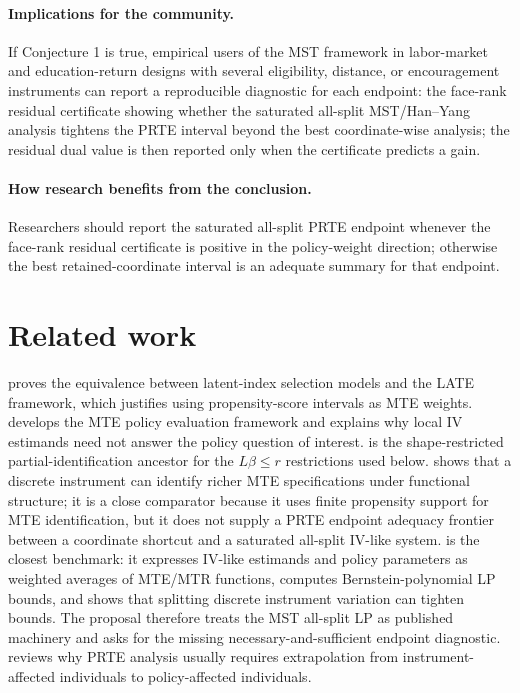 \documentclass[11pt]{article}
\theoremstyle{definition}
\theoremstyle{plain}
\theoremstyle{remark}
\begin{document}
\paragraph{Implications for the community.}
If Conjecture 1 is true, empirical users of the MST framework in
labor-market and education-return designs with several eligibility, distance,
or encouragement instruments can report a reproducible diagnostic for each
endpoint: the face-rank residual certificate showing whether the saturated all-split
MST/Han--Yang analysis tightens the PRTE interval beyond the best
coordinate-wise analysis; the residual dual value is then reported only when
the certificate predicts a gain.

\paragraph{How research benefits from the conclusion.}
Researchers should report the saturated all-split PRTE endpoint whenever the
face-rank residual certificate is positive in the policy-weight direction;
otherwise the best retained-coordinate interval is an adequate summary for
that endpoint.

\section{Related work}
\citet{Vytlacil2002} proves the equivalence between latent-index selection
models and the LATE framework, which justifies using propensity-score
intervals as MTE weights.  \citet{HeckmanVytlacil2005} develops the MTE policy
evaluation framework and explains why local IV estimands need not answer the
policy question of interest.  \citet{ManskiPepper2000} is the shape-restricted
partial-identification ancestor for the \(L\beta\le r\) restrictions used
below.  \citet{BrinchMogstadWiswall2017} shows that a discrete instrument can
identify richer MTE specifications under functional structure; it is a close
comparator because it uses finite propensity support for MTE identification,
but it does not supply a PRTE endpoint adequacy frontier between a coordinate
shortcut and a saturated all-split IV-like system.  \citet{MogstadSantosTorgovitsky2018}
is the closest benchmark: it expresses IV-like estimands and policy
parameters as weighted averages of MTE/MTR functions, computes
Bernstein-polynomial LP bounds, and shows that splitting discrete instrument
variation can tighten bounds.  The proposal therefore treats the MST all-split
LP as published machinery and asks for the missing necessary-and-sufficient
endpoint diagnostic.
\citet{MogstadTorgovitsky2018Review} reviews why PRTE analysis usually
requires extrapolation from instrument-affected individuals to policy-affected
individuals.
\end{document}
